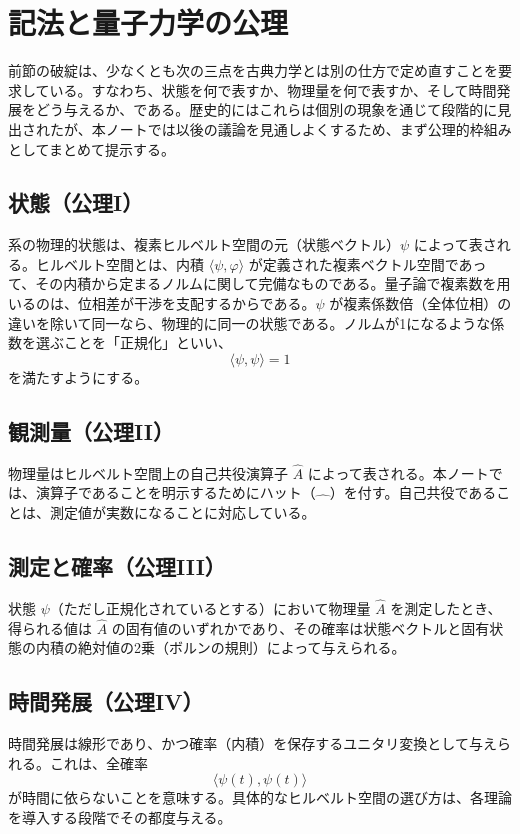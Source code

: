 \section{記法と量子力学の公理}
前節の破綻は、少なくとも次の三点を古典力学とは別の仕方で定め直すことを要求している。すなわち、状態を何で表すか、物理量を何で表すか、そして時間発展をどう与えるか、である。歴史的にはこれらは個別の現象を通じて段階的に見出されたが、本ノートでは以後の議論を見通しよくするため、まず公理的枠組みとしてまとめて提示する。

\subsection{状態（公理I）}
系の物理的状態は、複素ヒルベルト空間の元（状態ベクトル）$\psi$ によって表される。ヒルベルト空間とは、内積 $\langle \psi,\varphi\rangle$ が定義された複素ベクトル空間であって、その内積から定まるノルムに関して完備なものである。量子論で複素数を用いるのは、位相差が干渉を支配するからである。$\psi$ が複素係数倍（全体位相）の違いを除いて同一なら、物理的に同一の状態である。ノルムが1になるような係数を選ぶことを「正規化」といい、
\[
\langle \psi,\psi\rangle =1
\]
を満たすようにする。

\subsection{観測量（公理II）}
物理量はヒルベルト空間上の自己共役演算子 $\hat{A}$ によって表される。本ノートでは、演算子であることを明示するためにハット（$\hat{\quad}$）を付す。自己共役であることは、測定値が実数になることに対応している。

\subsection{測定と確率（公理III）}
状態 $\psi$（ただし正規化されているとする）において物理量 $\hat{A}$ を測定したとき、得られる値は $\hat{A}$ の固有値のいずれかであり、その確率は状態ベクトルと固有状態の内積の絶対値の2乗（ボルンの規則）によって与えられる。

\subsection{時間発展（公理IV）}
時間発展は線形であり、かつ確率（内積）を保存するユニタリ変換として与えられる。これは、全確率
\[
\langle \psi(t),\psi(t)\rangle
\]
が時間に依らないことを意味する。具体的なヒルベルト空間の選び方は、各理論を導入する段階でその都度与える。
